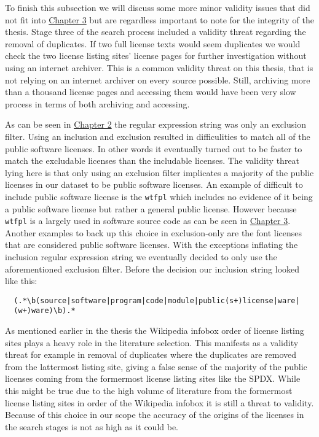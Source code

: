 To finish this subsection we will discuss some more minor validity issues that did not fit into \hyperref[results]{Chapter 3} but are regardless important to note for the integrity of the thesis. Stage three of the search process included a validity threat regarding the removal of duplicates. If two full license texts would seem duplicates we would check the two license listing sites' license pages for further investigation without using an internet archiver. This is a common validity threat on this thesis, that is not relying on an internet archiver on every source possible. Still, archiving more than a thousand license pages and accessing them would have been very slow process in terms of both archiving and accessing.

As can be seen in  \hyperref[methods]{Chapter 2} the regular expression string was only an exclusion filter. Using an inclusion and exclusion resulted in difficulities to match all of the public software licenses. In other words it eventually turned out to be faster to match the excludable licenses than the includable licenses. The validity threat lying here is that only using an exclusion filter implicates a majority of the public licenses in our dataset to be public software licenses. An example of difficult to include public software license is the \texttt{wtfpl} which includes no evidence of it being a public software license but rather a general public license. However because \texttt{wtfpl} is a largely used in software source code as can be seen in \hyperref[results]{Chapter 3}. Another examples to back up this choice in exclusion-only are the font licenses that are considered public software licenses. With the exceptions inflating the inclusion regular expression string we eventually decided to only use the aforementioned exclusion filter. Before the decision our inclusion string looked like this:
\begin{verbatim}
  (.*\b(source|software|program|code|module|public(s+)license|ware|
  (w+)ware)\b).*
\end{verbatim}

As mentioned earlier in the thesis the Wikipedia infobox order of license listing sites plays a heavy role in the literature selection. This manifests as a validity threat for example in removal of duplicates where the duplicates are removed from the lattermost listing site, giving a false sense of the majority of the public licenses coming from the formermost license listing sites like the SPDX. While this might be true due to the high volume of literature from the formermost license listing sites in order of the Wikipedia infobox it is still a threat to validity. Because of this choice in our scope the accuracy of the origins of the licenses in the search stages is not as high as it could be.

